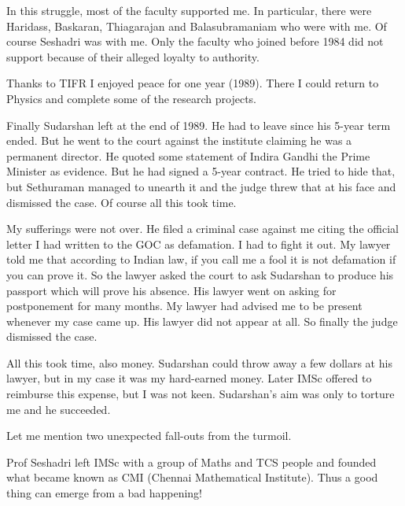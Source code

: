 
In this struggle, most of the faculty supported me. In parti\-cular, there 
were Haridass, Baskaran, Thiagarajan and Balasubra\-maniam who were with 
me. Of course Seshadri was with me. Only the faculty who joined before 
1984 did not support because of their alleged loyalty to authority.

Thanks to TIFR I enjoyed peace for one year (1989). There I could return 
to Physics and complete some of the research pro\-jects.

Finally Sudarshan left at the end of 1989. He had to leave since his 
5-year term ended. But he went to the court against the institute 
claiming he was a permanent director. He quoted some statement of Indira 
Gandhi the Prime Minister as evidence. But he had signed a 5-year 
contract. He tried to hide that, but Sethuraman managed to unearth it 
and the judge threw that at his face and dismissed the case. Of course 
all this took time.

My sufferings were not over. He filed a criminal case against me citing 
the official letter I had written to the GOC as defamation. I had to 
fight it out. My lawyer told me that according to Indian law, if you 
call me a fool it is not defamation if you can prove it. So the 
lawyer asked the court to ask Sudarshan to produce his passport which 
will prove his absence. His lawyer went on asking for postponement for 
many months. My lawyer had advised me to be present whenever my case 
came up. His lawyer did not appear at all. So finally the judge 
dismissed the case.

All this took time, also money. Sudarshan could throw away a few dollars 
at his lawyer, but in my case it was my hard-earned money. Later IMSc 
offered to reimburse this expense, but I was not keen. Sudarshan's aim 
was only to torture me and he succeeded.

Let me mention two unexpected fall-outs from the turmoil.

Prof Seshadri left IMSc with a group of Maths and TCS people and founded 
what became known as CMI (Chennai Mathematical Institute). Thus a good 
thing can emerge from a bad happening!

